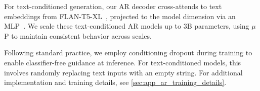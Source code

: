 For text-conditioned generation,  our AR decoder cross-attends to text embeddings from FLAN-T5-XL~\cite{chung2024flan}, projected to the model dimension via an MLP~\cite{chen2023pixart}. We scale these text-conditioned AR models up to 3B parameters, using $\mu$P to maintain consistent behavior across scales.

Following standard practice, we employ conditioning dropout during training to enable classifier-free guidance at inference. For text-conditioned models, this involves randomly replacing text inputs with an empty string.
For additional implementation and training details, see \cref{sec:app_ar_training_details}.
